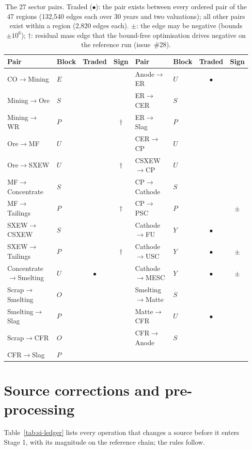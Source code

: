 \documentclass[11pt]{article}
\begin{document}
\begin{table}[h]
\centering\small
\begin{tabular}{@{}llcc@{\hskip 14pt}llcc@{}}
\toprule
Pair & Block & Traded & Sign & Pair & Block & Traded & Sign \\
\midrule
CO$\to$Mining & $E$ & & & Anode$\to$ER & $U$ & $\bullet$ & \\
Mining$\to$Ore & $S$ & & & ER$\to$CER & $S$ & & \\
Mining$\to$WR & $P$ & & $\dagger$ & ER$\to$Slag & $P$ & & \\
Ore$\to$MF & $U$ & & & CER$\to$CP & $U$ & & \\
Ore$\to$SXEW & $U$ & & $\dagger$ & CSXEW$\to$CP & $U$ & & \\
MF$\to$Concentrate & $S$ & & & CP$\to$Cathode & $S$ & & \\
MF$\to$Tailings & $P$ & & $\dagger$ & CP$\to$PSC & $P$ & & $\pm$ \\
SXEW$\to$CSXEW & $S$ & & & Cathode$\to$FU & $Y$ & $\bullet$ & \\
SXEW$\to$Tailings & $P$ & & $\dagger$ & Cathode$\to$USC & $Y$ & $\bullet$ & $\pm$ \\
Concentrate$\to$Smelting & $U$ & $\bullet$ & & Cathode$\to$MESC & $Y$ & $\bullet$ & $\pm$ \\
Scrap$\to$Smelting & $O$ & & & Smelting$\to$Matte & $S$ & & \\
Smelting$\to$Slag & $P$ & & & Matte$\to$CFR & $U$ & $\bullet$ & \\
Scrap$\to$CFR & $O$ & & & CFR$\to$Anode & $S$ & & \\
CFR$\to$Slag & $P$ & & & & & & \\
\bottomrule
\end{tabular}
\caption{The 27 sector pairs. Traded ($\bullet$): the pair exists between
every ordered pair of the 47 regions (132{,}540 edges each over 30 years and
two valuations); all other pairs exist within a region (2{,}820 edges each).
$\pm$: the edge may be negative (bounds $\pm 10^{6}$); $\dagger$: residual
mass edge that the bound-free optimisation drives negative on the reference
run (issue~\#28).}
\label{tab:si-pairs}
\end{table}

\section{Source corrections and pre-processing}\label{si:corrections}

Table~\ref{tab:si-ledger} lists every operation that changes a source
before it enters Stage 1, with its magnitude on the reference chain; the
rules follow.
\end{document}
